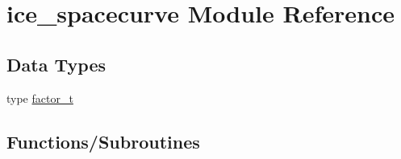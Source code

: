 \hypertarget{namespaceice__spacecurve}{
\section{ice\_\-spacecurve Module Reference}
\label{namespaceice__spacecurve}
}
\subsection*{Data Types}
\begin{DoxyCompactItemize}
\item 
type \hyperlink{typeice__spacecurve_1_1factor__t}{factor\_\-t}
\end{DoxyCompactItemize}
\subsection*{Functions/Subroutines}
